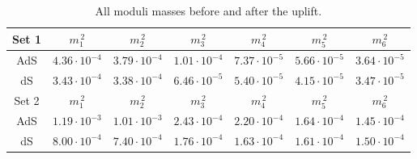 \documentclass[a4paper,12pt,twoside,openright]{report}
\begin{document}
\begin{table}[H]
\center
\begin{tabular}{|c|c|c|c|c|c|c|}\hline
Set 1 & $m_{1}^{\,2}$ & $m_{2}^{\,2}$  & $m_{3}^{\,2}$ & $m_{4}^{\,2}$ & $m_{5}^{\,2}$ & $m_{6}^{\,2}$ \\\hline
AdS & $4.36\cdot10^{-4}$& $3.79\cdot 10^{-4}$& $1.01\cdot 10^{-4}$ & $7.37\cdot 10^{-5}$& $5.66 \cdot 10^{-5}$ & $3.64 \cdot 10^{-5}$ \\\hline
dS & $3.43\cdot10^{-4}$& $3.38\cdot 10^{-4}$& $6.46\cdot 10^{-5}$ & $5.40\cdot 10^{-5}$& $4.15 \cdot 10^{-5}$ & $3.47 \cdot 10^{-5}$ \\\hline\hline
Set 2 & $m_{1}^{\,2}$ & $m_{2}^{\,2}$  & $m_{3}^{\,2}$ & $m_{4}^{\,2}$ & $m_{5}^{\,2}$ & $m_{6}^{\,2}$ \\\hline
AdS & $1.19 \cdot 10^{-3}$ & $1.01\cdot 10^{-3}$& $2.43 \cdot 10^{-4}$ & $2.20 \cdot 10^{-4}$& $1.64 \cdot 10^{-4}$ & $1.45\cdot 10^{-4}$  \\\hline
dS & $8.00 \cdot 10^{-4}$ & $7.40 \cdot 10^{-4}$ & $1.76\cdot 10^{-4}$ & $1.63 \cdot 10^{-4}$ & $1.61 \cdot 10^{-4}$& $1.50 \cdot 10^{-4}$  \\\hline
\end{tabular}
\caption{All moduli masses before and after the uplift.} 
\label{tab:IIAupliftmass}
\end{table}
\end{document}
